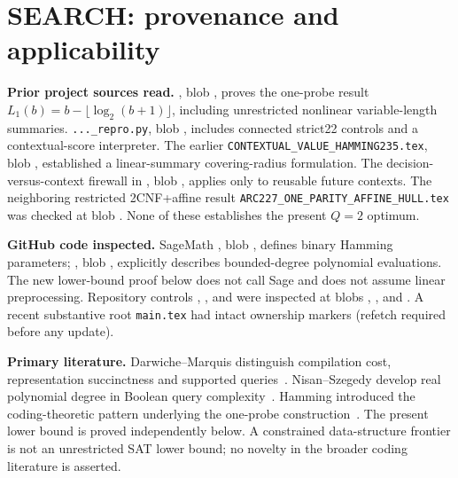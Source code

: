 \documentclass[10pt]{article}
\begin{document}
\section{SEARCH: provenance and applicability}
\noindent\textbf{Prior project sources read.} , blob , proves the one-probe result $L_1(b)=b-\lfloor\log_2(b+1)\rfloor$, including unrestricted nonlinear variable-length summaries. \texttt{...\_repro.py}, blob , includes connected strict22 controls and a contextual-score interpreter. The earlier \texttt{CONTEXTUAL\_VALUE\_HAMMING235.tex}, blob , established a linear-summary covering-radius formulation. The decision-versus-context firewall in , blob , applies only to reusable future contexts. The neighboring restricted 2CNF+affine result \texttt{ARC227\_ONE\_PARITY\_AFFINE\_HULL.tex} was checked at blob . None of these establishes the present $Q=2$ optimum.

\noindent\textbf{GitHub code inspected.} SageMath , blob , defines binary Hamming parameters; , blob , explicitly describes bounded-degree polynomial evaluations. The new lower-bound proof below does not call Sage and does not assume linear preprocessing. Repository controls , , and  were inspected at blobs , , and . A recent substantive root \texttt{main.tex} had intact ownership markers (refetch required before any update).

\noindent\textbf{Primary literature.} Darwiche--Marquis distinguish compilation cost, representation succinctness and supported queries~\cite{darwiche2002}. Nisan--Szegedy develop real polynomial degree in Boolean query complexity~\cite{nisan1994}. Hamming introduced the coding-theoretic pattern underlying the one-probe construction~\cite{hamming1950}. The present lower bound is proved independently below. A constrained data-structure frontier is not an unrestricted SAT lower bound; no novelty in the broader coding literature is asserted.
\end{document}

